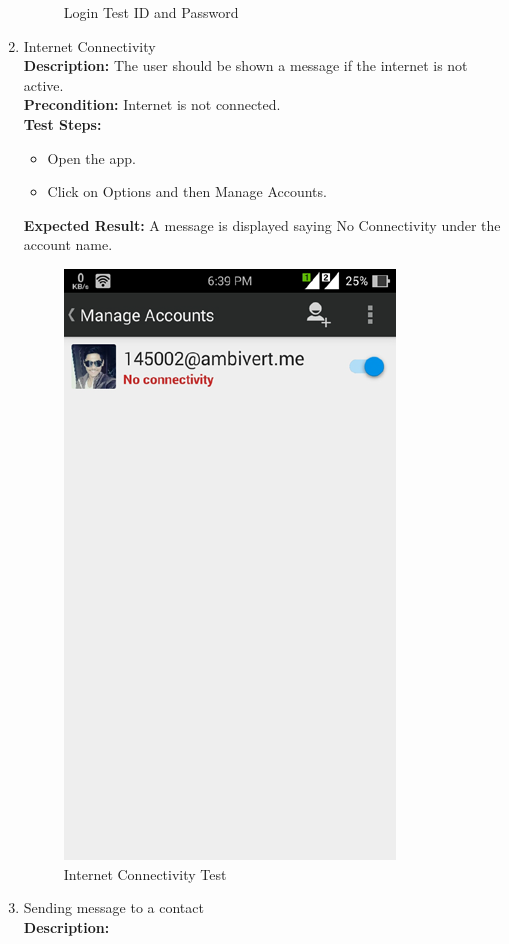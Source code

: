 \begin{enumerate}
\begin{figure}[ht]
\caption{Login Test ID and Password}
\end{figure}
\item Internet Connectivity\\
\noindent \textbf{Description:}
The user should be shown a message if the internet is not active.\\
\noindent \textbf{Precondition:}
Internet is not connected.\\
\noindent \textbf{Test Steps:}
\begin{itemize}
\item Open the app.
\item Click on Options and then Manage Accounts.
\end{itemize}
\noindent \textbf{Expected Result:}
A message is displayed saying No Connectivity under the account name.
\begin{figure}[ht]
\centering
\includegraphics[scale=0.3]{input/images/s2.png}
\caption{Internet Connectivity Test}
\end{figure}
\item Sending message to a contact\\
\noindent \textbf{Description:}

\end{enumerate}
